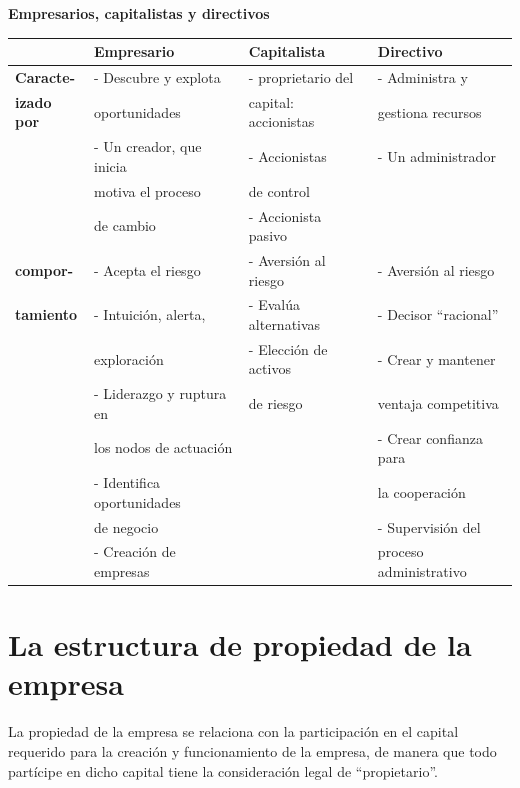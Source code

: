\documentclass[12pt,a4paper,spanish]{report}
\begin{document}
		\begin{center}
			\textbf{Empresarios, capitalistas y directivos}
			\begin{tabular}{|>{\columncolor[rgb]{0.9,0.3,0.3}}l | l | l | l |}
				\hline
				\rowcolor[rgb]{0.9,0.3,0.3} & \textbf{Empresario} & \textbf{Capitalista} & \textbf{Directivo} \\
				\hline
				\textbf{Caracte-} & - Descubre y explota & - proprietario del & - Administra y \\
				\textbf{izado por} & oportunidades & capital: accionistas & gestiona recursos \\
				& - Un creador, que inicia & - Accionistas & - Un administrador \\
				& motiva el proceso & de control & \\
				& de cambio & - Accionista pasivo & \\
				\hline
				\textbf{compor-} & - Acepta el riesgo & - Aversión al riesgo & - Aversión al riesgo \\
				\textbf{tamiento}& - Intuición, alerta, & - Evalúa alternativas & - Decisor ``racional'' \\
				& exploración & - Elección de activos & - Crear y mantener \\
				& - Liderazgo y ruptura en & de riesgo & ventaja competitiva \\
				& los nodos de actuación & & - Crear confianza para \\
				& - Identifica oportunidades & & la cooperación \\
				& de negocio & & - Supervisión del \\
				& - Creación de empresas & & proceso administrativo \\
				\hline
			\end{tabular}
		\end{center}

	\section{\textcolor[rgb]{0.9,0.3,0.3}La estructura de propiedad de la empresa}
		La propiedad de la empresa se relaciona con la participación en el capital requerido para la creación y funcionamiento de la empresa, de manera que todo partícipe en dicho capital tiene la consideración legal de ``propietario''.
\end{document}
